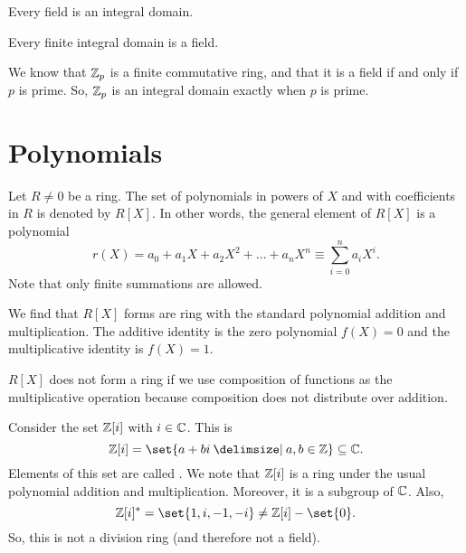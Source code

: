 \documentclass[11pt]{penrose}
\begin{document}
\begin{nthm}
    Every field is an integral domain.
\end{nthm}

\begin{nthm}
    Every finite integral domain is a field.
\end{nthm}

\begin{negg}
    We know that $\mathbb{Z}_p$ is a finite commutative ring, and that it is a field if and only if $p$ is prime. So, $\mathbb{Z}_p$ is an integral domain exactly when $p$ is prime.
\end{negg}

\section{Polynomials}

\begin{negg}
    Let $R \neq 0$ be a ring. The set of polynomials in powers of $X$ and with coefficients in $R$ is denoted by $R[X]$. In other words, the general element of $R[X]$ is a polynomial
    \begin{equation*}
        r(X) = a_0 + a_1 X + a_2 X^2 + \dots + a_n X^n \equiv \sum_{i=0}^n a_i X^i.
    \end{equation*}
    Note that only finite summations are allowed.

    We find that $R[X]$ forms are ring with the standard polynomial addition and multiplication. The additive identity is the zero polynomial $f(X) = 0$ and the multiplicative identity is $f(X) = 1$.

    $R[X]$ does not form a ring if we use composition of functions as the multiplicative operation because composition does not distribute over addition.
\end{negg}

\begin{negg}
    Consider the set $\mathbb{Z}[i]$ with $i \in \mathbb{C}$. This is
    \begin{equation*}
        \Z[i] = \set{a + bi \st a, b \in \Z} \subseteq \C.
    \end{equation*}
    Elements of this set are called . We note that $\mathbb{Z}[i]$ is a ring under the usual polynomial addition and multiplication. Moreover, it is a subgroup of $\mathbb{C}$. Also,
    \begin{equation*}
        \Z[i]^* = \set{1, i, -1, -i} \neq \Z[i] - \set{0}.
    \end{equation*}
    So, this is not a division ring (and therefore not a field).
\end{negg}
\end{document}

